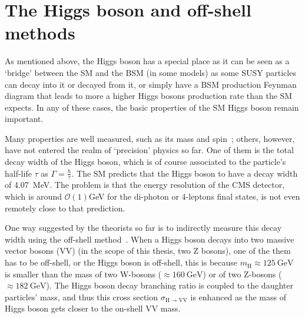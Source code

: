 \section{The Higgs boson and off-shell methods}\label{sec:physics_offshell}


As mentioned above, the Higgs boson has a special place as it can be seen as a `bridge' between
the SM and the BSM (in some models) as some SUSY particles can decay into it or decayed from it, 
or simply have a BSM production Feynman diagram that leads to more a higher Higgs
bosons production rate than the SM expects. In any of these cases, the basic properties of the SM Higgs
boson remain important.



Many properties are well measured, such as its mass and spin~\cite{cms_higgs}; others, however,
have not entered the realm of `precision' physics so far. One of them is the total decay width of
the Higgs boson, which is of course associated to the particle's half-life $\tau$ as $\Gamma=\frac{h}{\tau}$.
The SM predicts
that the Higgs boson to have a decay width of \SI{4.07}{\mega\electronvolt}. The problem is
that the energy resolution of the CMS detector, which is around $\mathcal{O}(1) $\si{\giga\electronvolt}
for the di-photon or 4-leptons final states, is not even remotely close to that prediction.

One way suggested by the theorists so far is to indirectly measure this decay width using the
off-shell method~\cite{offshell_theory1, offshell_theory2}. When a Higgs boson decays into two massive
vector bosons (VV) (in the scope of this thesis, two Z bosons),
one of the them has to be off-shell, or the Higgs boson is off-shell, this is because
$m_\text{H}\approx\SI{125}{\giga\electronvolt}$ is smaller than the 
mass of two W-bosons ($\approx\SI{160}{\giga\electronvolt}$) 
or of two Z-bosons ($\approx\SI{182}{\giga\electronvolt}$). The Higgs boson decay branching ratio
is coupled to the daughter particles' mass, and thus this cross section
$\sigma_{\mathrm{H}\rightarrow\mathrm{VV}}$ is enhanced as the mass of Higgs boson gets closer to 
the on-shell VV mass.  

